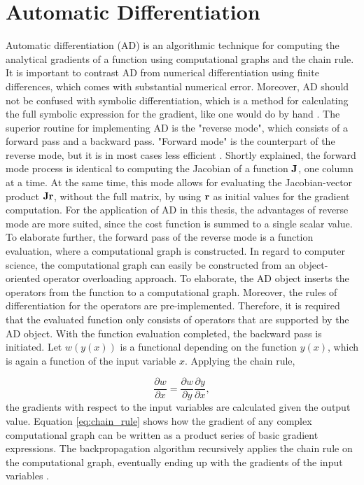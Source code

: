 

\section{Automatic Differentiation}\label{sec:theory_AD}
\noindent
Automatic differentiation (AD) is an algorithmic technique for computing the analytical gradients of a function using computational graphs and the chain rule.
It is important to contrast AD from numerical differentiation using finite differences, which comes with substantial numerical error.
Moreover, AD should not be confused with symbolic differentiation, which is a method for calculating the full symbolic expression for the gradient, like one would do by hand \cite{baydin2018automatic}.
The superior routine for implementing AD is the "reverse mode", which consists of a forward pass and a backward pass.
"Forward mode" is the counterpart of the reverse mode, but it is in most cases less efficient \cite{baydin2018automatic}.
Shortly explained, the forward mode process is identical to computing the Jacobian of a function $\bm{\mathrm{J}}$, one column at a time.
At the same time, this mode allows for evaluating the Jacobian-vector product $\bm{\mathrm{Jr}}$, without the full matrix, by using $\bm{\mathrm{r}}$ as initial values for the gradient computation.
For the application of AD in this thesis, the advantages of reverse mode are more suited, since the cost function is summed to a single scalar value.
To elaborate further, the forward pass of the reverse mode is a function evaluation, where a computational graph is constructed.
In regard to computer science, the computational graph can easily be constructed from an object-oriented operator overloading approach.
To elaborate, the AD object inserts the operators from the function to a computational graph.
Moreover, the rules of differentiation for the operators are pre-implemented.
Therefore, it is required that the evaluated function only consists of operators that are supported by the AD object.
With the function evaluation completed, the backward pass is initiated.
Let $w(y(x))$ is a functional depending on the function $y(x)$, which is again a function of the input variable $x$. Applying the chain rule,

\begin{equation}\label{eq:chain_rule}
    \frac{\partial w}{\partial x} = \frac{\partial w}{\partial y} \frac{\partial y}{\partial x},
\end{equation}
the gradients with respect to the input variables are calculated given the output value.
Equation \eqref{eq:chain_rule} shows how the gradient of any complex computational graph can be written as a product series of basic gradient expressions.
The backpropagation algorithm recursively applies the chain rule on the computational graph, eventually ending up with the gradients of the input variables \cite{baydin2018automatic}.

